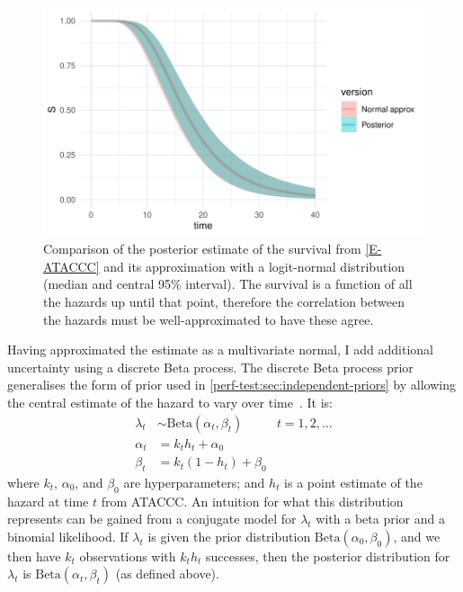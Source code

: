 \documentclass[12pt, letterpaper]{article} %
\begin{document}
\begin{figure}
  \centering \includegraphics{cis-perfect-testing/ataccc-approximation-survival}
  \caption[Approximating the ATACCC posterior survival as a logit-normal]{Comparison of the posterior estimate of the survival from \cref{E-ATACCC} and its approximation with a logit-normal distribution (median and central 95\% interval). The survival is a function of all the hazards up until that point, therefore the correlation between the hazards must be well-approximated to have these agree. \label{perf-test:fig:approximate-ATACCC-survival}}
\end{figure}

Having approximated the estimate as a multivariate normal, I add additional uncertainty using a discrete Beta process.
The discrete Beta process prior generalises the form of prior used in \cref{perf-test:sec:independent-priors} by allowing the central estimate of the hazard to vary over time~\autocite{ibrahimBayesian,sunStatisticala}.
It is:
\begin{align}
  \lambda_t &\sim \text{Beta}(\alpha_t, \beta_t) &t = 1, 2, \dots \\
  \alpha_t &= k_t h_t + \alpha_0 \\
  \beta_t &= k_t (1 - h_t) + \beta_0
\end{align}
where $k_t$, $\alpha_0$, and $\beta_0$ are hyperparameters; and $h_t$ is a point estimate of the hazard at time $t$ from ATACCC.
An intuition for what this distribution represents can be gained from a conjugate model for $\lambda_t$ with a beta prior and a binomial likelihood.
If $\lambda_t$ is given the prior distribution $\text{Beta}(\alpha_0, \beta_0)$, and we then have $k_t$ observations with $k_t h_t$ successes, then the posterior distribution for $\lambda_t$ is $\text{Beta}(\alpha_t, \beta_t)$ (as defined above).
\end{document}
